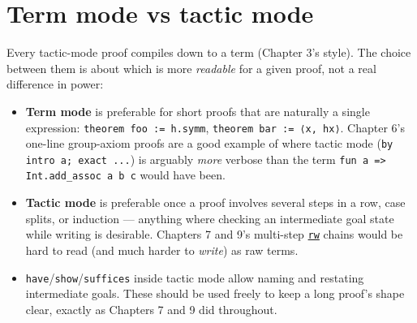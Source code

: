 \section{Term mode vs tactic mode}\label{sec:12-working-efficiently:04-term-vs-tactic-mode:1}

Every tactic-mode proof compiles down to a term (Chapter 3's style). The choice between them is about which is more \emph{readable} for a given proof, not a real difference in power:

\begin{itemize}
\tightlist
\item
  \textbf{Term mode} is preferable for short proofs that are naturally a single expression: \texttt{theorem foo := h.symm}, \texttt{theorem bar := ⟨x, hx⟩}. Chapter 6's one-line group-axiom proofs are a good example of where tactic mode (\texttt{by intro a; exact ...}) is arguably \emph{more} verbose than the term \texttt{fun a => Int.add\_assoc a b c} would have been.
\item
  \textbf{Tactic mode} is preferable once a proof involves several steps in a row, case splits, or induction --- anything where checking an intermediate goal state while writing is desirable. Chapters 7 and 9's multi-step \href{https://lean-lang.org/doc/reference/latest/Tactic-Proofs/Tactic-Reference/}{\texttt{rw}} chains would be hard to read (and much harder to \emph{write}) as raw terms.
\item
  \texttt{have}/\texttt{show}/\texttt{suffices} inside tactic mode allow naming and restating intermediate goals. These should be used freely to keep a long proof's shape clear, exactly as Chapters 7 and 9 did throughout.
\end{itemize}
